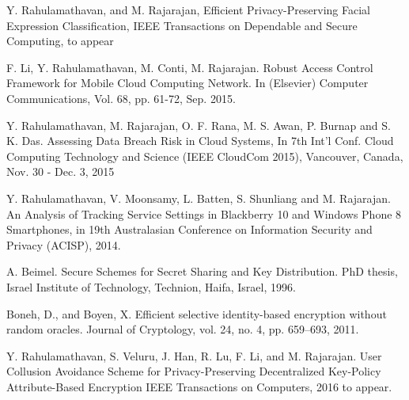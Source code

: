 \documentclass[10pt,journal]{IEEEtran}
\begin{document}
\begin{thebibliography}{5}
 Y. Rahulamathavan, and M. Rajarajan, Efficient Privacy-Preserving Facial Expression Classification, IEEE Transactions on Dependable and Secure Computing, to appear

 F. Li, Y. Rahulamathavan, M. Conti, M. Rajarajan. Robust Access Control Framework for Mobile Cloud Computing Network. In (Elsevier) Computer Communications, Vol. 68, pp. 61-72, Sep. 2015.

Y. Rahulamathavan, M. Rajarajan, O. F. Rana, M. S. Awan, P. Burnap and S. K. Das. Assessing Data Breach Risk in Cloud Systems, In 7th Int'l Conf. Cloud Computing Technology and Science (IEEE CloudCom 2015), Vancouver, Canada, Nov. 30 - Dec. 3, 2015

Y. Rahulamathavan, V. Moonsamy, L. Batten, S. Shunliang and M. Rajarajan. An Analysis of Tracking Service Settings in Blackberry 10 and Windows Phone 8 Smartphones, in 19th Australasian Conference on Information Security and Privacy (ACISP), 2014.

 A. Beimel. Secure Schemes for Secret Sharing and Key Distribution. PhD thesis, Israel
Institute of Technology, Technion, Haifa, Israel, 1996.

Boneh, D., and Boyen, X. Efficient selective identity-based encryption without random oracles. Journal of Cryptology, vol. 24, no. 4, pp. 659--693, 2011.

Y. Rahulamathavan, S. Veluru, J. Han, R. Lu, F. Li, and M. Rajarajan. User Collusion Avoidance Scheme for Privacy-Preserving Decentralized Key-Policy Attribute-Based Encryption
IEEE Transactions on Computers, 2016 to appear.











\end{thebibliography}
\end{document}
